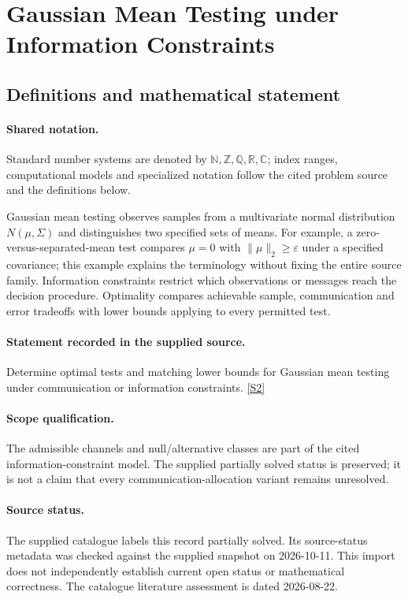 \documentclass[11pt]{article}
\newcommand{\sref}[2]{\hyperlink{source:#1:#2}{[S#2]}}
\begin{document}
\section{Gaussian Mean Testing under Information Constraints}\label{statement}

\subsection{Definitions and mathematical statement}

\paragraph{Shared notation.}Standard number systems are denoted by $\mathbb N,\mathbb Z,\mathbb Q,\mathbb R,\mathbb C$; index ranges, computational models and specialized notation follow the cited problem source and the definitions below.


Gaussian mean testing observes samples from a multivariate normal distribution $N(\mu,\Sigma)$ and distinguishes two specified sets of means. For example, a zero-versus-separated-mean test compares $\mu=0$ with $\lVert\mu\rVert_2\geq\varepsilon$ under a specified covariance; this example explains the terminology without fixing the entire source family. Information constraints restrict which observations or messages reach the decision procedure. Optimality compares achievable sample, communication and error tradeoffs with lower bounds applying to every permitted test.
\paragraph{Statement recorded in the supplied source.}
Determine optimal tests and matching lower bounds for Gaussian mean testing under communication or information constraints. \sref{statement}{2}
\paragraph{Scope qualification.}
The admissible channels and null/alternative classes are part of the cited information-constraint model. The supplied partially solved status is preserved; it is not a claim that every communication-allocation variant remains unresolved.
\paragraph{Source status.}
The supplied catalogue labels this record partially solved. Its source-status metadata was checked against the supplied snapshot on 2026-10-11. This import does not independently establish current open status or mathematical correctness. The catalogue literature assessment is dated 2026-08-22.
\end{document}
